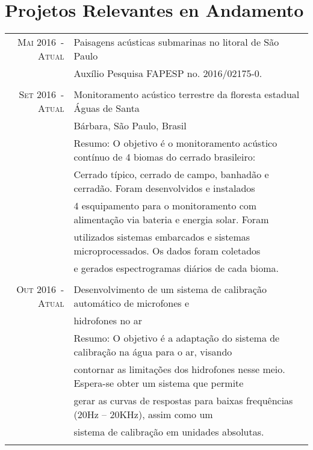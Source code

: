 \documentclass[a4paper,10pt]{article}
\begin{document}
\section{Projetos Relevantes en Andamento}
\begin{tabular}{rl}

    \textsc{Mai 2016~-~Atual}   & Paisagens acústicas submarinas no litoral de São Paulo\\
                                &\footnotesize{Auxílio Pesquisa FAPESP no. 2016/02175-0.}\\
                                &\\

    \textsc{Set 2016~-~Atual}   & Monitoramento acústico terrestre da floresta estadual Águas de Santa \\
                                & Bárbara, São Paulo,  Brasil \\
                                &\footnotesize{Resumo: O objetivo é o monitoramento acústico contínuo de 4 biomas do cerrado brasileiro:}\\ 
                                &\footnotesize{Cerrado típico, cerrado de campo, banhadão e cerradão. Foram desenvolvidos e instalados}\\ 
                                &\footnotesize{4 esquipamento para o monitoramento com alimentação via bateria e energia solar. Foram}\\
                                &\footnotesize{utilizados sistemas embarcados e sistemas microprocessados. Os dados foram coletados}\\ 
                                &\footnotesize{e gerados espectrogramas diários de cada bioma.}\\
                                &\\

    \textsc{Out 2016~-~Atual}   & Desenvolvimento de um sistema de calibração automático de microfones e \\
                                & hidrofones no ar\\ 
                                &\footnotesize{Resumo: O objetivo é a adaptação do sistema de calibração na água para o ar, visando}\\ 
                                &\footnotesize{contornar as limitações dos hidrofones nesse meio. Espera-se obter um sistema que permite}\\ 
                                &\footnotesize{gerar as curvas de respostas para baixas frequências (20Hz – 20KHz), assim como um}\\ 
                                &\footnotesize{sistema de calibração em unidades absolutas.}\\
                                &\\



\end{tabular}
\end{document}

